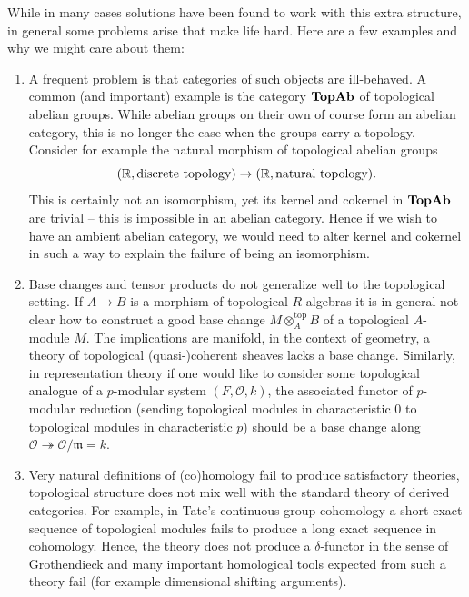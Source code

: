 While in many cases solutions have been found to work with this extra structure, in general some problems arise that make life hard. Here are a few examples and why we might care about them:
\begin{enumerate}
	\item
	A frequent problem is that categories of such objects are ill-behaved. A common (and important) example is \eg the category ${{\mathbf{TopAb}}}$ of topological abelian groups. While abelian groups on their own of course form an abelian category, this is no longer the case when the groups carry a topology. Consider for example the natural morphism of topological abelian groups
	$$({\mathbb{R}}, \text{discrete topology}) \to  ({\mathbb{R}}, \text{natural topology}).$$
	This is certainly not an isomorphism, yet its kernel and cokernel in ${{\mathbf{TopAb}}}$ are trivial -- this is impossible in an abelian category. Hence if we wish to have an ambient abelian category, we would need to alter kernel and cokernel in such a way to explain the failure of being an isomorphism.
	
	\item
	Base changes and tensor products do not generalize well to the topological setting. If $A\to B$ is a morphism of topological $R$-algebras it is in general not clear how to construct a good base change $M\otimes_A^\text{top} B$ of a topological $A$-module $M$. The implications are manifold, \eg in the context of geometry, a theory of topological (quasi-)coherent sheaves lacks a base change. Similarly, in representation theory if one would like to consider some topological analogue of a $p$-modular system $(F, \mathcal O, k)$, the associated functor of $p$-modular reduction (sending topological modules in characteristic $0$ to topological modules in characteristic $p$) should be a base change along $\mathcal O \twoheadrightarrow \mathcal O/\mathfrak m = k$.
	
	\item 
	Very natural definitions of (co)homology fail to produce satisfactory theories, \ie topological structure does not mix well with the standard theory of derived categories. For example, in Tate's continuous group cohomology a short exact sequence of topological modules fails to produce a long exact sequence in cohomology. Hence, the theory does not produce a $\delta$-functor in the sense of Grothendieck and many important homological tools expected from such a theory fail (for example dimensional shifting arguments).
\end{enumerate}

